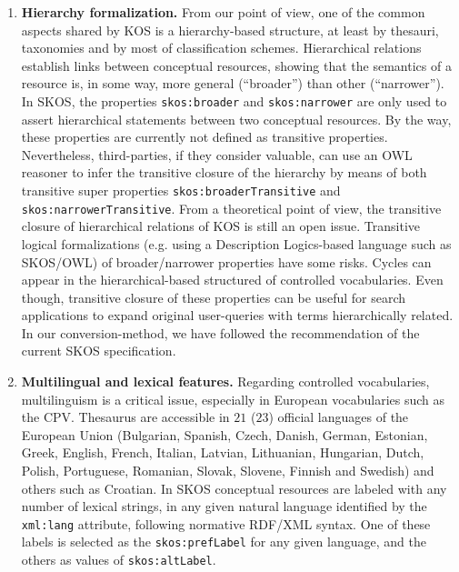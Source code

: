 \begin{enumerate}
 \item \textbf{Hierarchy formalization.} From our point of view, one of the common aspects shared by 
 KOS is a hierarchy-based structure, at least by thesauri, taxonomies and by most of 
 classification schemes. Hierarchical relations establish links between conceptual resources, 
 showing that the semantics of a resource is, in some way, more general (``broader'') than other (``narrower''). 
 In SKOS, the properties \texttt{skos:broader} and \texttt{skos:narrower} are only used to assert hierarchical 
 statements between two conceptual resources. By the way, these properties are currently not defined 
 as transitive properties. Nevertheless, third-parties, if they consider valuable, can use an OWL reasoner 
 to infer the transitive closure of the hierarchy by means of both transitive super properties 
 \texttt{skos:broaderTransitive} and \texttt{skos:narrowerTransitive}. From a theoretical point of view, the transitive closure of hierarchical relations 
 of KOS is still an open issue. Transitive logical formalizations (e.g. using a Description Logics-based language such as SKOS/OWL) 
 of broader/narrower properties have some risks. Cycles can appear in the hierarchical-based structured 
 of controlled vocabularies. Even though, transitive closure of these properties can be useful for 
 search applications to expand original user-queries with terms hierarchically related. In our conversion-method, 
 we have followed the recommendation of the current SKOS specification.
 
 \item \textbf{Multilingual and lexical features.} Regarding controlled vocabularies, 
 multilinguism is a critical issue, especially in European vocabularies such as the CPV. 
 Thesaurus are accessible in $21$ ($23$) official languages of the European Union 
 (Bulgarian, Spanish, Czech, Danish, German, Estonian, Greek, English, French, Italian, Latvian, Lithuanian, 
 Hungarian, Dutch, Polish, Portuguese, Romanian, Slovak, Slovene, Finnish and Swedish) and others such as Croatian. 
 In SKOS conceptual resources are labeled with any number of lexical strings, in any given natural 
 language identified by the \texttt{xml:lang} attribute, following normative RDF/XML syntax. 
 One of these labels is selected as the \texttt{skos:prefLabel} for any given language, and the 
 others as values of \texttt{skos:altLabel}.
 
\end{enumerate}
